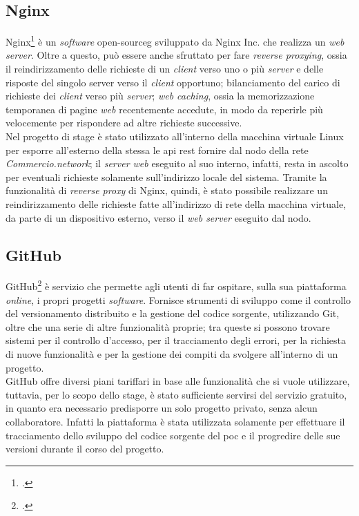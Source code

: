 \subsection{Nginx}

Nginx\footcite{site:nginx} è un \textit{software} \gls{open-sourceg} sviluppato da Nginx Inc. che realizza un \textit{web server}. Oltre a questo, può essere anche sfruttato per fare \textit{reverse proxying}, ossia il reindirizzamento delle richieste di un \textit{client} verso uno o più \textit{server} e delle risposte del singolo server verso il \textit{client} opportuno; bilanciamento del carico di richieste dei \textit{client} verso più \textit{server}; \textit{web caching}, ossia la memorizzazione temporanea di pagine \textit{web} recentemente accedute, in modo da reperirle più velocemente per rispondere ad altre richieste successive.\\
Nel progetto di stage è stato utilizzato all'interno della macchina virtuale Linux per esporre all'esterno della stessa le \gls{api} \gls{rest} fornire dal nodo della rete \textit{Commercio.network}; il \textit{server web} eseguito al suo interno, infatti, resta in ascolto per eventuali richieste solamente sull'indirizzo locale del sistema. Tramite la funzionalità di \textit{reverse proxy} di Nginx, quindi, è stato possibile realizzare un reindirizzamento delle richieste fatte all'indirizzo di rete della macchina virtuale, da parte di un dispositivo esterno, verso il \textit{web server} eseguito dal nodo.

\subsection{GitHub}

GitHub\footcite{site:github} è servizio che permette agli utenti di far ospitare, sulla sua piattaforma \textit{online}, i propri progetti \textit{software}. Fornisce strumenti di sviluppo come il controllo del versionamento distribuito e la gestione del codice sorgente, utilizzando Git, oltre che una serie di altre funzionalità proprie; tra queste si possono trovare sistemi per il controllo d'accesso, per il tracciamento degli errori, per la richiesta di nuove funzionalità e per la gestione dei compiti da svolgere all'interno di un progetto.\\
GitHub offre diversi piani tariffari in base alle funzionalità che si vuole utilizzare, tuttavia, per lo scopo dello stage, è stato sufficiente servirsi del servizio gratuito, in quanto era necessario predisporre un solo progetto privato, senza alcun collaboratore. Infatti la piattaforma è stata utilizzata solamente per effettuare il tracciamento dello sviluppo del codice sorgente del \gls{poc} e il progredire delle sue versioni durante il corso del progetto.


